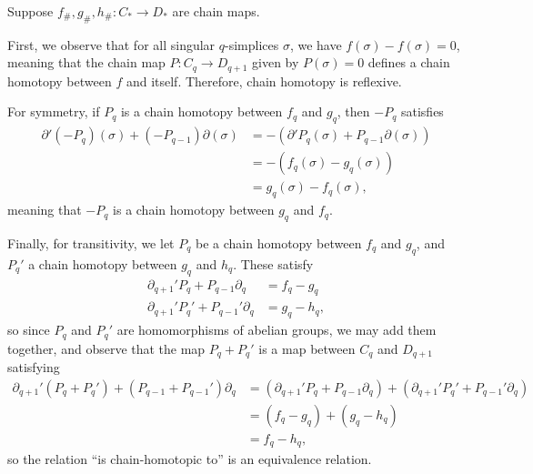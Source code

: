 \documentclass[10pt]{mypackage}
\begin{document}
\begin{solution}
  Suppose $f_{\#},g_{\#},h_{\#}\colon C_{\ast}\rightarrow D_{\ast}$ are chain maps.

  First, we observe that for all singular $q$-simplices $\sigma$, we have $f(\sigma)-f(\sigma) = 0$, meaning that the chain map $P\colon C_{q}\rightarrow D_{q+1}$ given by $P(\sigma) = 0$ defines a chain homotopy between $f$ and itself. Therefore, chain homotopy is reflexive.

  For symmetry, if $P_q$ is a chain homotopy between $f_{q}$ and $g_q$, then $-P_q$ satisfies
  \begin{align*}
    \partial'\left( -P_q \right)(\sigma) + \left( -P_{q-1} \right)\partial(\sigma) &= - \left( \partial'P_q(\sigma) + P_{q-1}\partial(\sigma) \right)\\
                                                                                   &= -\left( f_q(\sigma)-g_q(\sigma) \right)\\
                                                                                   &= g_{q}(\sigma)-f_q(\sigma),
  \end{align*}
  meaning that $-P_q$ is a chain homotopy between $g_q$ and $f_q$.

  Finally, for transitivity, we let $P_q$ be a chain homotopy between $f_q$ and $g_q$, and $P_q'$ a chain homotopy between $g_q$ and $h_q$. These satisfy
  \begin{align*}
    \partial_{q+1}'P_q + P_{q-1}\partial_q &= f_q - g_q\\
    \partial_{q+1}'P_q' + P_{q-1}'\partial_q &= g_q - h_q,
  \end{align*}
  so since $P_q$ and $P_q'$ are homomorphisms of abelian groups, we may add them together, and observe that the map $P_q + P_q'$ is a map between $C_q$ and $D_{q+1}$ satisfying
  \begin{align*}
    \partial_{q+1}'\left( P_q + P_q' \right) + \left( P_{q-1} +P_{q-1}' \right)\partial_q &= \left( \partial_{q+1}'P_q + P_{q-1}\partial_q \right) + \left( \partial_{q+1}'P_q' + P_{q-1}'\partial_q \right)\\
                                                                                          &= \left( f_q - g_q \right) + \left( g_q - h_q \right)\\
                                                                                          &= f_q - h_q,
  \end{align*}
  so the relation ``is chain-homotopic to'' is an equivalence relation.
\end{solution}
\end{document}

